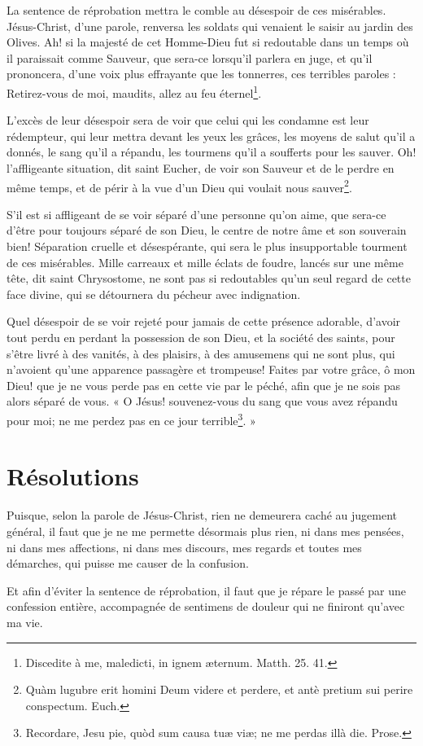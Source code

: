 \documentclass[instructions.tex]{subfiles}
\begin{document}
\secundo La sentence de réprobation mettra le comble au désespoir de ces misérables. Jésus-Christ, d’une parole, renversa les soldats qui venaient le saisir au jardin des Olives. Ah! si la majesté de cet Homme-Dieu fut si redoutable dans un temps où il paraissait comme Sauveur, que sera-ce lorsqu’il parlera en juge, et qu’il prononcera, d’une voix plus effrayante que les tonnerres, ces terribles paroles : Retirez-vous de moi, maudits, allez au feu éternel\footnote{Discedite à me, maledicti, in ignem æternum. Matth. 25. 41.}.
 
L’excès de leur désespoir sera de voir que celui qui les condamne est leur rédempteur, qui leur mettra devant les yeux les grâces, les moyens de salut qu’il a donnés, le sang qu’il a répandu, les tourmens qu’il a soufferts pour les sauver. Oh! l’affligeante situation, dit saint Eucher, de voir son Sauveur et de le perdre en même temps, et de périr à la vue d’un Dieu qui voulait nous sauver\footnote{Quàm lugubre erit homini Deum videre et perdere, et antè pretium sui perire conspectum. Euch.}.
 
S’il est si affligeant de se voir séparé d’une personne qu’on aime, que sera-ce d’être pour toujours séparé de son Dieu, le centre de notre âme et son souverain bien! Séparation cruelle et désespérante, qui sera le plus insupportable tourment de ces misérables. Mille carreaux et mille éclats de foudre, lancés sur une même tête, dit saint Chrysostome, ne sont pas si redoutables qu’un seul regard de cette face divine, qui se détournera du pécheur avec indignation.
 
Quel désespoir de se voir rejeté pour jamais de cette présence adorable, d’avoir tout perdu en perdant la possession de son Dieu, et la société des saints, pour s’être livré à des vanités, à des plaisirs, à des amusemens qui ne sont plus, qui n’avoient qu’une apparence passagère et trompeuse! Faites par votre grâce, ô mon Dieu! que je ne vous perde pas en cette vie par le péché, afin que je ne sois pas alors séparé de vous. « O Jésus! souvenez-vous du sang que vous avez répandu pour moi; ne me perdez pas en ce jour terrible\footnote{Recordare, Jesu pie, quòd sum causa tuæ viæ; ne me perdas illà die. Prose.}. »
 
\section{Résolutions}
 
\primo Puisque, selon la parole de Jésus-Christ, rien ne demeurera caché au jugement général, il faut que je ne me permette désormais plus rien, ni dans mes pensées, ni dans mes affections, ni dans mes discours, mes regards et toutes mes démarches, qui puisse me causer de la confusion.
 
\secundo Et afin d’éviter la sentence de réprobation, il faut que je répare le passé par une confession entière, accompagnée de sentimens de douleur qui ne finiront qu’avec ma vie.
 
\end{document}
